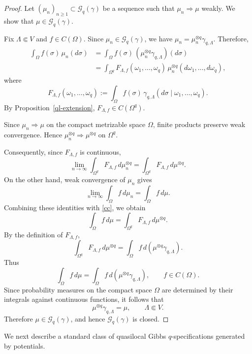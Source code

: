 \documentclass[11pt,reqno]{amsart}
\numberwithin{equation}{section} \setcounter{tocdepth}{1}
\begin{document}
\begin{proof}
	Let $(\mu_n)_{n\geq1}\subset\mathcal G_q(\gamma)$ be a sequence such
	that $\mu_n\Longrightarrow\mu$
	weakly. We show that $\mu\in\mathcal G_q(\gamma)$.
	
	Fix $\Lambda\Subset V$ and $f\in C(\Omega)$. Since
	$\mu_n\in\mathcal G_q(\gamma)$, we have $\mu_n
	=
	\mu_n^{\otimes q}\gamma_{q,\Lambda}.
	$
	Therefore,
	\begin{equation}\label{cc}
		\begin{aligned}
			\int_\Omega f(\sigma)\,\mu_n(d\sigma)
			&=
			\int_\Omega
			f(\sigma)\,
			(\mu_n^{\otimes q}\gamma_{q,\Lambda})(d\sigma)
			\\
			&=
			\int_{\Omega^q}
			F_{\Lambda,f}(\omega_1,\ldots,\omega_q)\,
			\mu_n^{\otimes q}
			(d\omega_1,\ldots,d\omega_q),
		\end{aligned}
	\end{equation}
	where
	\[
	F_{\Lambda,f}(\omega_1,\ldots,\omega_q)
	:=
	\int_\Omega
	f(\sigma)\,
	\gamma_{q,\Lambda}
	(d\sigma\mid\omega_1,\ldots,\omega_q).
	\]
	By Proposition~\ref{ql-extension}, $F_{\Lambda,f}\in C(\Omega^q)$.
		
	Since $	\mu_n\Longrightarrow\mu$
	on the compact metrizable space $\Omega$, finite products preserve weak
	convergence. Hence $\mu_n^{\otimes q}\Longrightarrow
	\mu^{\otimes q}$ on $\Omega^q$.
	
	Consequently, since $F_{\Lambda,f}$ is continuous,
	\[
	\lim_{n\to\infty}
	\int_{\Omega^q}
	F_{\Lambda,f}\,d\mu_n^{\otimes q}
	=
	\int_{\Omega^q}
	F_{\Lambda,f}\,d\mu^{\otimes q}.
	\]
	On the other hand, weak convergence of $\mu_n$ gives
	\[
	\lim_{n\to\infty}
	\int_\Omega f\,d\mu_n
	=
	\int_\Omega f\,d\mu.
	\]
	Combining these identities with \eqref{cc}, we obtain
	\[
	\int_\Omega f\,d\mu
	=
	\int_{\Omega^q}
	F_{\Lambda,f}\,d\mu^{\otimes q}.
	\]
	By the definition of $F_{\Lambda,f}$,
	\[
	\int_{\Omega^q}
	F_{\Lambda,f}\,d\mu^{\otimes q}
	=
	\int_\Omega
	f\,d(\mu^{\otimes q}\gamma_{q,\Lambda}).
	\]
	Thus
	\[
	\int_\Omega f\,d\mu
	=
	\int_\Omega
	f\,d(\mu^{\otimes q}\gamma_{q,\Lambda}),
	\qquad
	f\in C(\Omega).
	\]
	Since probability measures on the compact space $\Omega$ are
	determined by their integrals against continuous functions, it follows
	that
		\[
	\mu^{\otimes q}\gamma_{q,\Lambda}
	=
	\mu,
	\qquad
	\Lambda\Subset V.
	\]
	Therefore $	\mu\in\mathcal G_q(\gamma)$, and hence $\mathcal G_q(\gamma)$ is closed.
\end{proof}


We next describe a standard class of quasilocal Gibbs
$q$-specifications generated by potentials.
\end{document}

